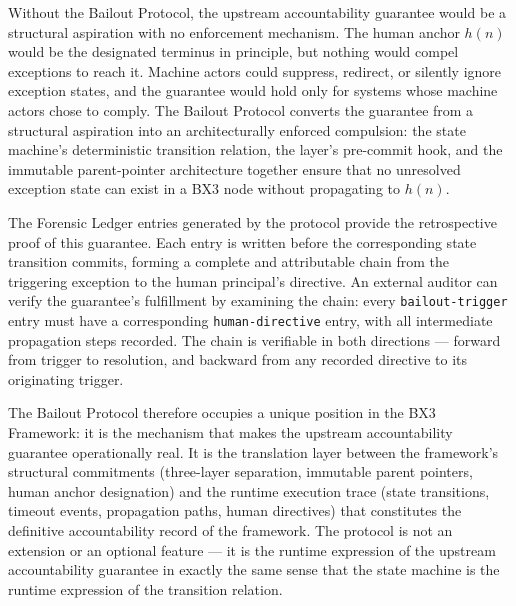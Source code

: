 Without the Bailout Protocol, the upstream accountability guarantee would be a
structural aspiration with no enforcement mechanism.  The human anchor $h(n)$
would be the designated terminus in principle, but nothing would compel
exceptions to reach it.  Machine actors could suppress, redirect, or silently
ignore exception states, and the guarantee would hold only for systems whose
machine actors chose to comply.  The Bailout Protocol converts the guarantee
from a structural aspiration into an architecturally enforced compulsion: the
state machine's deterministic transition relation, the \factLayer{} layer's
pre-commit hook, and the immutable parent-pointer architecture together ensure
that no unresolved exception state can exist in a BX3 node without propagating
to $h(n)$.

The Forensic Ledger entries generated by the protocol provide the retrospective
proof of this guarantee.  Each entry is written before the corresponding state
transition commits, forming a complete and attributable chain from the
triggering exception to the human principal's directive.  An external auditor
can verify the guarantee's fulfillment by examining the chain: every
\texttt{bailout-trigger} entry must have a corresponding \texttt{human-directive}
entry, with all intermediate propagation steps recorded.  The chain is
verifiable in both directions --- forward from trigger to resolution, and
backward from any recorded directive to its originating trigger.

The Bailout Protocol therefore occupies a unique position in the BX3
Framework: it is the mechanism that makes the upstream accountability guarantee
operationally real.  It is the translation layer between the framework's
structural commitments (three-layer separation, immutable parent pointers,
human anchor designation) and the runtime execution trace (state transitions,
timeout events, propagation paths, human directives) that constitutes the
definitive accountability record of the framework.  The protocol is not an
extension or an optional feature --- it is the runtime expression of the
upstream accountability guarantee in exactly the same sense that the state
machine is the runtime expression of the transition relation.